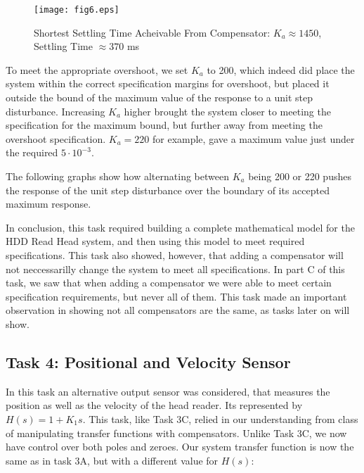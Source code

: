 \documentclass{article}
\newcommand{\matlab}[1]{%
%
}
\begin{document}
\matlab{fig6.m}

\begin{figure}[H]
  \caption{Shortest Settling Time Acheivable From Compensator: 
  $K_a \approx 1450$, Settling Time $\approx 370$ ms}
  \centering
  \texttt{[image: fig6.eps]}
\end{figure}

To meet the appropriate overshoot, we set $K_a$ to 200, which
indeed did place the system within the correct specification margins for
overshoot, but placed it outside the bound of the maximum value of the response
 to a unit step disturbance. Increasing $K_a$ higher brought the system
closer to meeting the specification for the maximum bound, but further away from
meeting the overshoot specification. $K_a = 220$ for example, gave a maximum
value just under the required $5\cdot10^{-3}$.

The following graphs show how alternating between $K_a$ being 200 or 220 pushes
the response of the unit step disturbance over the boundary of its accepted 
maximum response.


\matlab{fig7.m}

\matlab{fig8.m}



In conclusion, this task required building a complete mathematical model for
the HDD Read Head system, and then using this model to meet required
specifications. This task also showed, however, that adding a compensator will
not neccessarilly change the system to meet all specifications. In part C of
this task, we saw that when adding a compensator we were able to meet certain
specification requirements, but never all of them. This task made an important
observation in showing not all compensators are the same, as tasks later on
will show.

\subsection*{Task 4: Positional and Velocity Sensor}

In this task an alternative output sensor was considered, that measures the
position as well as the velocity of the head reader. Its represented by $H(s)
= 1 + K_1s$. This task, like Task 3C, relied in our understanding from class of
manipulating transfer functions with compensators. Unlike Task 3C, we now have
control over both poles and zeroes. Our system transfer function is now the 
same as in task 3A, but with a different value for $H(s)$:
\end{document}

